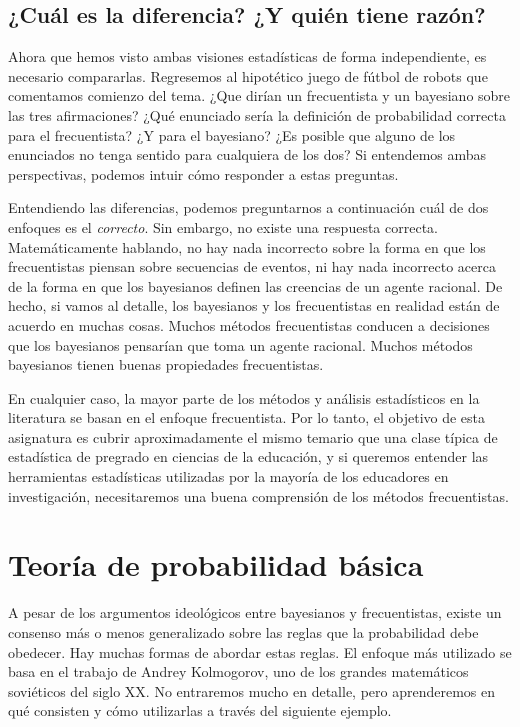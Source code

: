 \documentclass[spanish,]{book}
\begin{document}
\subsection{¿Cuál es la diferencia? ¿Y quién tiene
razón?}\label{cual-es-la-diferencia-y-quien-tiene-razon}

Ahora que hemos visto ambas visiones estadísticas de forma
independiente, es necesario compararlas. Regresemos al hipotético juego
de fútbol de robots que comentamos comienzo del tema. ¿Que dirían un
frecuentista y un bayesiano sobre las tres afirmaciones? ¿Qué enunciado
sería la definición de probabilidad correcta para el frecuentista? ¿Y
para el bayesiano? ¿Es posible que alguno de los enunciados no tenga
sentido para cualquiera de los dos? Si entendemos ambas perspectivas,
podemos intuir cómo responder a estas preguntas.

Entendiendo las diferencias, podemos preguntarnos a continuación cuál de
dos enfoques es el \emph{correcto}. Sin embargo, no existe una respuesta
correcta. Matemáticamente hablando, no hay nada incorrecto sobre la
forma en que los frecuentistas piensan sobre secuencias de eventos, ni
hay nada incorrecto acerca de la forma en que los bayesianos definen las
creencias de un agente racional. De hecho, si vamos al detalle, los
bayesianos y los frecuentistas en realidad están de acuerdo en muchas
cosas. Muchos métodos frecuentistas conducen a decisiones que los
bayesianos pensarían que toma un agente racional. Muchos métodos
bayesianos tienen buenas propiedades frecuentistas.

En cualquier caso, la mayor parte de los métodos y análisis estadísticos
en la literatura se basan en el enfoque frecuentista. Por lo tanto, el
objetivo de esta asignatura es cubrir aproximadamente el mismo temario
que una clase típica de estadística de pregrado en ciencias de la
educación, y si queremos entender las herramientas estadísticas
utilizadas por la mayoría de los educadores en investigación,
necesitaremos una buena comprensión de los métodos frecuentistas.

\section{Teoría de probabilidad básica}\label{basicprobability}

A pesar de los argumentos ideológicos entre bayesianos y frecuentistas,
existe un consenso más o menos generalizado sobre las reglas que la
probabilidad debe obedecer. Hay muchas formas de abordar estas reglas.
El enfoque más utilizado se basa en el trabajo de Andrey Kolmogorov, uno
de los grandes matemáticos soviéticos del siglo XX. No entraremos mucho
en detalle, pero aprenderemos en qué consisten y cómo utilizarlas a
través del siguiente ejemplo.
\end{document}
